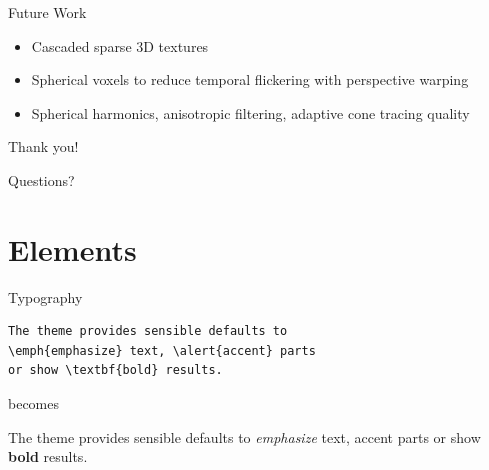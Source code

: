 \documentclass[10pt]{beamer}
\begin{document}
\begin{frame}{Future Work}


  \begin{itemize}
    \item Cascaded sparse 3D textures %
    \item Spherical voxels to reduce temporal flickering with perspective warping %
    \item Spherical harmonics, anisotropic filtering, adaptive cone tracing quality %
  \end{itemize}
\end{frame}

\begin{frame}{}
  \begin{center}
    \LARGE Thank you!
  \end{center}
\end{frame}

\begin{frame}{}
  \begin{center}
    \LARGE Questions?
  \end{center}
\end{frame}


\section{Elements}

\begin{frame}[fragile]{Typography}
      \begin{verbatim}The theme provides sensible defaults to
\emph{emphasize} text, \alert{accent} parts
or show \textbf{bold} results.\end{verbatim}

  \begin{center}becomes\end{center}

  The theme provides sensible defaults to \emph{emphasize} text,
  \alert{accent} parts or show \textbf{bold} results.
\end{frame}
\end{document}
